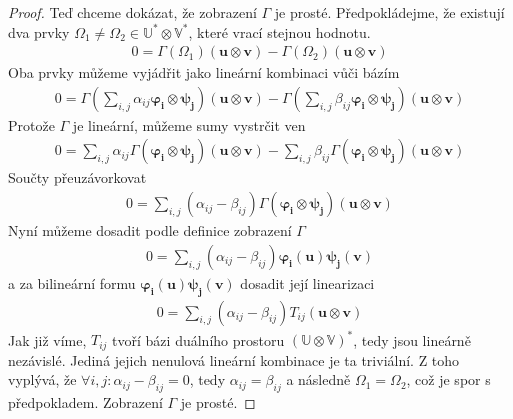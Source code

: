 \documentclass[a5paper,12pt]{amsbook}
\theoremstyle{definition}
\newcommand{\myvec}[1]{\bm{#1}}
\newcommand{\myspace}[1]{\mathbb{#1}}
\begin{document}
\begin{proof}
\medskip\noindent
Teď chceme dokázat, že zobrazení $\Gamma$ je prosté. Předpokládejme, že existují dva prvky
$\Omega_1\neq\Omega_2\in\myspace{U^*}\otimes\myspace{V^*}$, které vrací stejnou hodnotu.
\begin{equation*}
\begin{split}
0 = \Gamma(\Omega_1)(\myvec{u}\otimes\myvec{v}) - \Gamma(\Omega_2)(\myvec{u}\otimes\myvec{v})
\end{split}
\end{equation*}
Oba prvky můžeme vyjádřit jako lineární kombinaci vůči bázím
\begin{equation*}
\begin{split}
0 = \Gamma(\sum_{i,j}\alpha_{ij}\myvec{\varphi_i}\otimes\myvec{\psi_j})(\myvec{u}\otimes\myvec{v}) 
  - \Gamma(\sum_{i,j}\beta_{ij}\myvec{\varphi_i}\otimes\myvec{\psi_j})(\myvec{u}\otimes\myvec{v})
\end{split}
\end{equation*}
Protože $\Gamma$ je lineární, můžeme sumy vystrčit ven
\begin{equation*}
\begin{split}
0 = \sum_{i,j}\alpha_{ij}\Gamma(\myvec{\varphi_i}\otimes\myvec{\psi_j})(\myvec{u}\otimes\myvec{v}) 
- \sum_{i,j}\beta_{ij}\Gamma(\myvec{\varphi_i}\otimes\myvec{\psi_j})(\myvec{u}\otimes\myvec{v})
\end{split}
\end{equation*}
Součty přeuzávorkovat
\begin{equation*}
\begin{split}
0 = \sum_{i,j}(\alpha_{ij} - \beta_{ij})\Gamma(\myvec{\varphi_i}\otimes\myvec{\psi_j})
  (\myvec{u}\otimes\myvec{v})
\end{split}
\end{equation*}
Nyní můžeme dosadit podle definice zobrazení $\Gamma$
\begin{equation*}
\begin{split}
0 = \sum_{i,j}(\alpha_{ij} - \beta_{ij})\myvec{\varphi_i}(\myvec{u})\myvec{\psi_j}(\myvec{v})
\end{split}
\end{equation*}
a za bilineární formu $\myvec{\varphi_i}(\myvec{u})\myvec{\psi_j}(\myvec{v})$ dosadit její
linearizaci
\begin{equation*}
\begin{split}
0 = \sum_{i,j}(\alpha_{ij} - \beta_{ij})T_{ij}(\myvec{u}\otimes\myvec{v})
\end{split}
\end{equation*}
Jak již víme, $T_{ij}$ tvoří bázi duálního prostoru $(\myspace{U}\otimes\myspace{V})^*$, tedy
jsou lineárně nezávislé. Jediná jejich nenulová lineární kombinace je ta triviální.
Z toho vyplývá, že $\forall i,j: \alpha_{ij}-\beta_{ij} = 0$, tedy $\alpha_{ij} = \beta_{ij}$
a následně $\Omega_1 = \Omega_2$, což je spor s předpokladem. Zobrazení $\Gamma$ je prosté.


\end{proof}
\end{document}
